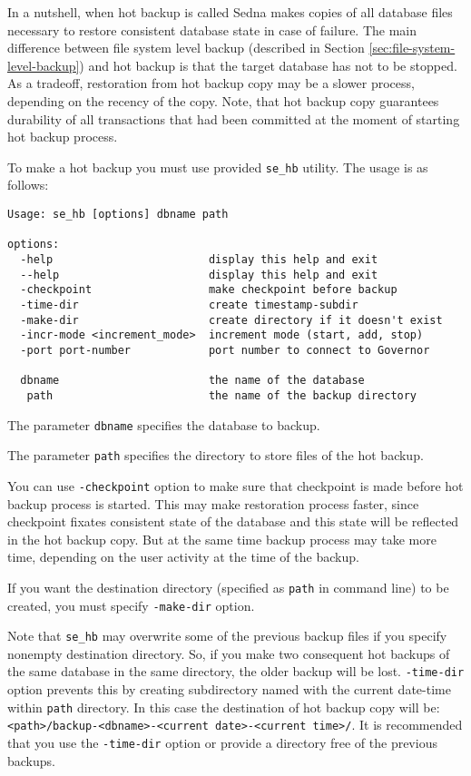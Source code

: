 \documentclass[a4paper,12pt]{article}
\begin{document}
In a nutshell, when hot backup is called Sedna makes copies of all database
files necessary to restore consistent database state in case of failure. The
main difference between file system level backup (described in Section
\ref{sec:file-system-level-backup}) and hot backup is that the target database
has not to be stopped. As a tradeoff, restoration from hot backup copy may be a
slower process, depending on the recency of the copy. Note, that hot backup copy
guarantees durability of all transactions that had been committed at the moment
of starting hot backup process.

To make a hot backup you must use provided \verb!se_hb! utility. The usage is as
follows:

\small{
\begin{verbatim}
Usage: se_hb [options] dbname path

options:
  -help                        display this help and exit
  --help                       display this help and exit
  -checkpoint                  make checkpoint before backup
  -time-dir                    create timestamp-subdir
  -make-dir                    create directory if it doesn't exist
  -incr-mode <increment_mode>  increment mode (start, add, stop)
  -port port-number            port number to connect to Governor

  dbname                       the name of the database
   path                        the name of the backup directory
\end{verbatim}}

The parameter \verb!dbname! specifies the database to backup.

The parameter \verb!path! specifies the directory to store files of the hot
backup.

You can use \verb!-checkpoint! option to make sure that checkpoint is made
before hot backup process is started. This may make restoration process faster,
since checkpoint fixates consistent state of the database and this state will be
reflected in the hot backup copy. But at the same time backup process may take
more time, depending on the user activity at the time of the backup.

If you want the destination directory (specified as \verb!path! in command line)
to be created, you must specify \verb!-make-dir! option.

Note that \verb!se_hb! may overwrite some of the previous backup files if you
specify nonempty destination directory. So, if you make two consequent hot
backups of the same database in the same directory, the older backup will be
lost. \verb!-time-dir! option prevents this by creating subdirectory named with
the current date-time within \verb!path! directory. In this case the destination
of hot backup copy will be:
\verb!<path>/backup-<dbname>-<current date>-<current time>/!.
It is recommended that you use the \verb!-time-dir! option or provide a
directory free of the previous backups.
\end{document}
